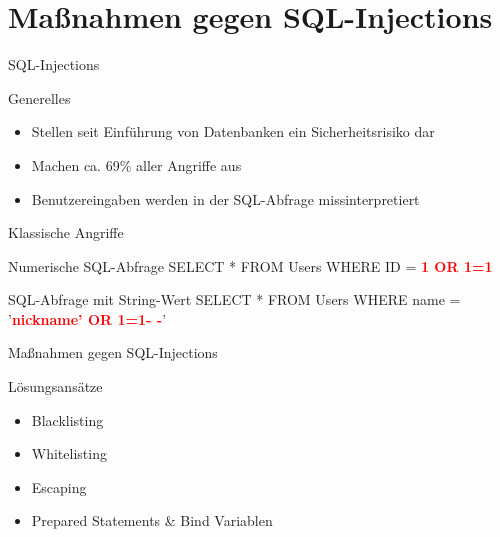\section{Maßnahmen gegen SQL-Injections}

\begin{frame}{SQL-Injections}
\begin{block}{Generelles}
\begin{itemize}[<+->]
	\item Stellen seit Einführung von Datenbanken ein Sicherheitsrisiko dar
	\item Machen ca. 69\% aller Angriffe aus \footnotemark
	\item Benutzereingaben werden in der SQL-Abfrage missinterpretiert
\end{itemize}
\end{block}
\end{frame}

\begin{frame}{Klassische Angriffe}
\begin{block}{Numerische SQL-Abfrage}
	SELECT * FROM Users WHERE ID = \textcolor{red}{\textbf{1 OR 1=1}}
\end{block}
\begin{block}{SQL-Abfrage mit String-Wert}
	SELECT * FROM Users WHERE name = '{}\textcolor{red}{\textbf{nickname'{} OR 1=1- -}}'{}
\end{block}
\end{frame}


\begin{frame}{Maßnahmen gegen SQL-Injections}
\begin{block}{Lösungsansätze}
\begin{itemize}[<+->]
\item Blacklisting 
\item Whitelisting
\item Escaping
\item Prepared Statements \& Bind Variablen
\end{itemize}
\end{block}
\end{frame}

